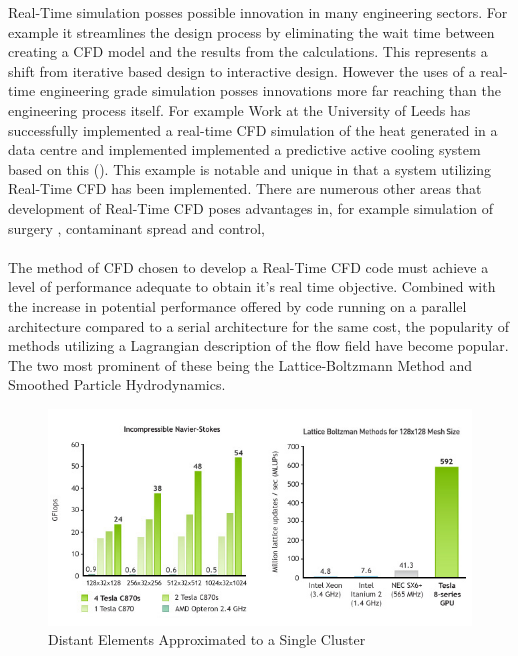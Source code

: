 Real-Time simulation posses possible innovation in many engineering sectors. For example it streamlines the design process by eliminating the wait time between creating a CFD model and the results from the calculations. This represents a shift from iterative based design to interactive design. However the uses of a real-time engineering grade simulation posses innovations more far reaching than the engineering process itself. For example Work at the University of Leeds has successfully implemented a real-time CFD simulation of the heat generated in a data centre and implemented implemented a predictive active cooling system based on this (\cite{khan_delbosc_noakes_summers_2015}). This example is notable and unique in that a system utilizing Real-Time CFD has been implemented. There are numerous other areas that development of Real-Time CFD poses advantages in, for example simulation of surgery \cite{c4c8c2aa4eea4ba190da55f77965537b}, contaminant spread and control, 
\\\\
The method of CFD chosen to develop a Real-Time CFD code must achieve a level of performance adequate to obtain it's real time objective. Combined with the increase in potential performance offered by code running on a parallel architecture compared to a serial architecture for the same cost, the popularity of methods utilizing a Lagrangian description of the flow field have become popular. The two most prominent of these being the Lattice-Boltzmann Method and Smoothed Particle Hydrodynamics. 

\begin{figure}[H]
\begin{center}
\includegraphics[width=1.0\textwidth]{Referenced_Figures/CPUGPU-Comparison.png}
\caption{\label{fig:GPUCPUCOMP}Distant Elements Approximated to a Single Cluster}
\end{center}
\end{figure}

